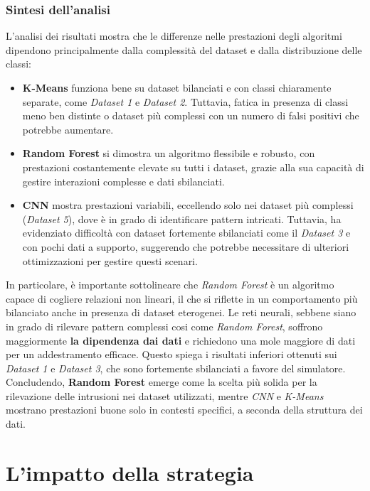 \subsubsection{Sintesi dell'analisi}
L'analisi dei risultati mostra che le differenze nelle prestazioni degli algoritmi dipendono principalmente dalla complessità del dataset e dalla distribuzione delle classi:
\begin{itemize}
\item \textbf{K-Means} funziona bene su dataset bilanciati e con classi chiaramente separate, come \textit{Dataset 1} e \textit{Dataset 2}. Tuttavia, fatica in presenza di classi meno ben distinte o dataset più complessi con un numero di falsi positivi che potrebbe aumentare.
\item \textbf{Random Forest} si dimostra un algoritmo flessibile e robusto, con prestazioni costantemente elevate su tutti i dataset, grazie alla sua capacità di gestire interazioni complesse e dati sbilanciati.
\item \textbf{CNN} mostra prestazioni variabili, eccellendo solo nei dataset più complessi (\textit{Dataset 5}), dove è in grado di identificare pattern intricati. Tuttavia, ha evidenziato difficoltà con dataset fortemente sbilanciati come il \textit{Dataset 3} e con pochi dati a supporto, suggerendo che potrebbe necessitare di ulteriori ottimizzazioni per gestire questi scenari.
\end{itemize}
In particolare, è importante sottolineare che \textit{Random Forest} è un algoritmo capace di cogliere relazioni non lineari, il che si riflette in un comportamento più bilanciato anche in presenza di dataset eterogenei. Le reti neurali, sebbene siano in grado di rilevare pattern complessi cosi come \textit{Random Forest}, soffrono maggiormente \textbf{la dipendenza dai dati} e richiedono una mole maggiore di dati per un addestramento efficace. Questo spiega i risultati inferiori ottenuti sui \textit{Dataset 1} e \textit{Dataset 3}, che sono fortemente sbilanciati a favore del simulatore.
Concludendo, \textbf{Random Forest} emerge come la scelta più solida per la rilevazione delle intrusioni nei dataset utilizzati, mentre \textit{CNN} e \textit{K-Means} mostrano prestazioni buone solo in contesti specifici, a seconda della struttura dei dati.

\section{L'impatto della strategia}

